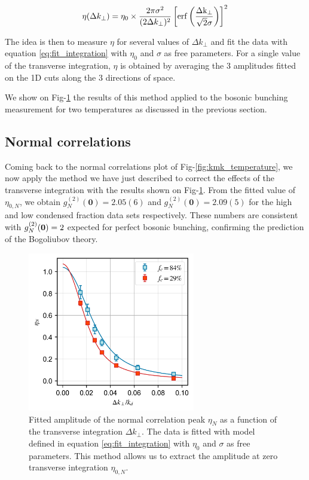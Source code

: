 \begin{equation}
    \eta (\Delta k_{\perp})= \eta_{0} \times \frac{2 \pi \sigma^2}{(2\Delta k_{\perp})^2}\left[\rm{erf} \left(\frac{\Delta k_{\perp}}{\sqrt{2}\sigma} \right)\right]^2
    \label{eq:fit_integration}
\end{equation}

The idea is then to measure $\eta$ for several values of $\Delta k_{\perp}$ and fit the data with equation \ref{eq:fit_integration} with $\eta_0$ and $\sigma$ as free parameters. For a single value of the transverse integration, $\eta$ is obtained by averaging the 3 amplitudes fitted on the 1D cuts along the 3 directions of space.


 We show on Fig-\ref{fig:integration_kk} the results of this method applied to the bosonic bunching measurement for two temperatures as discussed in the previous section. 

\subsection{Normal correlations}

Coming back to the normal correlations plot of Fig-\ref{fig:kmk_temperature}, we now apply the method we have just described to correct the effects of the transverse integration with the results shown on Fig-\ref{fig:integration_kk}. From the fitted value of $\eta_{0,N}$, we obtain $g^{(2)}_N(\bm{0})=2.05(6)$ and $g^{(2)}_N(\bm{0})=2.09(5)$ for the high and low condensed fraction data sets respectively. These numbers are consistent with $g^{(2)}_N (\bm{0})=2$ expected for perfect bosonic bunching, confirming the prediction of the Bogoliubov theory. 

\begin{figure}
    \centering
    \includegraphics[width=0.65\textwidth]{Fig/Chapter4/eta_vs_int_kk.png}
    \caption{Fitted amplitude of the normal correlation peak $\eta_N$ as a function of the transverse integration $\Delta k_{\perp}$. The data is fitted with model defined in equation \ref{eq:fit_integration} with $\eta_0$ and $\sigma$ as free parameters. This method allows us to extract the amplitude at zero transverse integration $\eta_{0,N}$.}
    \label{fig:integration_kk}
\end{figure}

